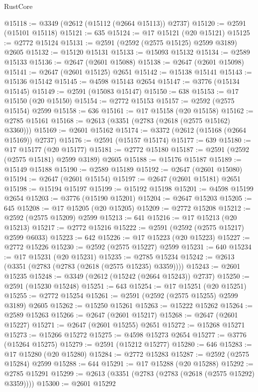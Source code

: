 \begin{lexlean}{RustCore}
\begin{coremodule}
@15118 := @3349 (@2612 (@15112 (@2664 @15113)) @2737)
@15120 := @2591 (@15101 @15118)
@15121 := 635
@15124 := @17 @15121 (@20 @15121)
@15125 := @2772 @15124
@15131 := @2591 (@2592 (@2575 @15125) @2599 @3189) @2605
@15132 := @15120 @15131
@15133 := @15093 @15132
@15134 := @2589 @15133
@15136 := @2647 (@2601 @15088)
@15138 := @2647 (@2601 @15098)
@15141 := @2647 (@2601 @15125) @2651
@15142 := @15138 @15141
@15143 := @15136 @15142
@15145 := @4598 @15143 @2654
@15147 := @3776 (@15134 @15145)
@15149 := @2591 (@15083 @15147)
@15150 := 638
@15153 := @17 @15150 (@20 @15150)
@15154 := @2772 @15153
@15157 := @2592 (@2575 @15154) @2599
@15158 := 636
@15161 := @17 @15158 (@20 @15158)
@15162 := @2785 @15161
@15168 := @2613 (@3351 (@2783 (@2618 (@2575 @15162) @3360)))
@15169 := @2601 @15162
@15174 := @3372 (@2612 (@15168 (@2664 @15169)) @2737)
@15176 := @2591 (@15157 @15174)
@15177 := 639
@15180 := @17 @15177 (@20 @15177)
@15181 := @2772 @15180
@15187 := @2591 (@2592 (@2575 @15181) @2599 @3189) @2605
@15188 := @15176 @15187
@15189 := @15149 @15188
@15190 := @2589 @15189
@15192 := @2647 (@2601 @15080)
@15194 := @2647 (@2601 @15154)
@15197 := @2647 (@2601 @15181) @2651
@15198 := @15194 @15197
@15199 := @15192 @15198
@15201 := @4598 @15199 @2654
@15203 := @3776 (@15190 @15201)
@15204 := @2647 @15203
@15205 := 645
@15208 := @17 @15205 (@20 @15205)
@15209 := @2772 @15208
@15212 := @2592 (@2575 @15209) @2599
@15213 := 641
@15216 := @17 @15213 (@20 @15213)
@15217 := @2772 @15216
@15222 := @2591 (@2592 (@2575 @15217) @2599 @6033)
@15223 := 642
@15226 := @17 @15223 (@20 @15223)
@15227 := @2772 @15226
@15230 := @2592 (@2575 @15227) @2599
@15231 := 640
@15234 := @17 @15231 (@20 @15231)
@15235 := @2785 @15234
@15242 := @2613 (@3351 (@2783 (@2783 (@2618 (@2575 @15235) @3359))))
@15243 := @2601 @15235
@15248 := @3349 (@2612 (@15242 (@2664 @15243)) @2737)
@15250 := @2591 (@15230 @15248)
@15251 := 643
@15254 := @17 @15251 (@20 @15251)
@15255 := @2772 @15254
@15261 := @2591 (@2592 (@2575 @15255) @2599 @3189) @2605
@15262 := @15250 @15261
@15263 := @15222 @15262
@15264 := @2589 @15263
@15266 := @2647 (@2601 @15217)
@15268 := @2647 (@2601 @15227)
@15271 := @2647 (@2601 @15255) @2651
@15272 := @15268 @15271
@15273 := @15266 @15272
@15275 := @4598 @15273 @2654
@15277 := @3776 (@15264 @15275)
@15279 := @2591 (@15212 @15277)
@15280 := 646
@15283 := @17 @15280 (@20 @15280)
@15284 := @2772 @15283
@15287 := @2592 (@2575 @15284) @2599
@15288 := 644
@15291 := @17 @15288 (@20 @15288)
@15292 := @2785 @15291
@15299 := @2613 (@3351 (@2783 (@2783 (@2618 (@2575 @15292) @3359))))
@15300 := @2601 @15292

\end{coremodule}
\end{lexlean}
